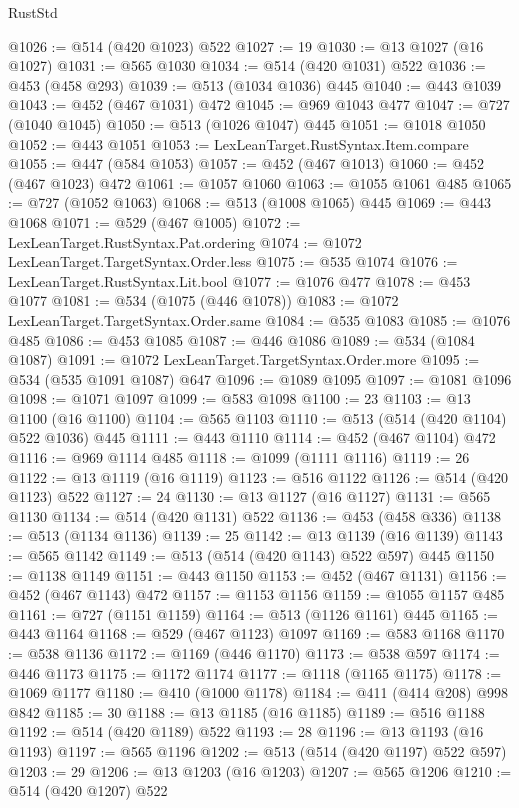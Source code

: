 \begin{lexlean}{RustStd}
\begin{coremodule}
@1026 := @514 (@420 @1023) @522
@1027 := 19
@1030 := @13 @1027 (@16 @1027)
@1031 := @565 @1030
@1034 := @514 (@420 @1031) @522
@1036 := @453 (@458 @293)
@1039 := @513 (@1034 @1036) @445
@1040 := @443 @1039
@1043 := @452 (@467 @1031) @472
@1045 := @969 @1043 @477
@1047 := @727 (@1040 @1045)
@1050 := @513 (@1026 @1047) @445
@1051 := @1018 @1050
@1052 := @443 @1051
@1053 := LexLeanTarget.RustSyntax.Item.compare
@1055 := @447 (@584 @1053)
@1057 := @452 (@467 @1013)
@1060 := @452 (@467 @1023) @472
@1061 := @1057 @1060
@1063 := @1055 @1061 @485
@1065 := @727 (@1052 @1063)
@1068 := @513 (@1008 @1065) @445
@1069 := @443 @1068
@1071 := @529 (@467 @1005)
@1072 := LexLeanTarget.RustSyntax.Pat.ordering
@1074 := @1072 LexLeanTarget.TargetSyntax.Order.less
@1075 := @535 @1074
@1076 := LexLeanTarget.RustSyntax.Lit.bool
@1077 := @1076 @477
@1078 := @453 @1077
@1081 := @534 (@1075 (@446 @1078))
@1083 := @1072 LexLeanTarget.TargetSyntax.Order.same
@1084 := @535 @1083
@1085 := @1076 @485
@1086 := @453 @1085
@1087 := @446 @1086
@1089 := @534 (@1084 @1087)
@1091 := @1072 LexLeanTarget.TargetSyntax.Order.more
@1095 := @534 (@535 @1091 @1087) @647
@1096 := @1089 @1095
@1097 := @1081 @1096
@1098 := @1071 @1097
@1099 := @583 @1098
@1100 := 23
@1103 := @13 @1100 (@16 @1100)
@1104 := @565 @1103
@1110 := @513 (@514 (@420 @1104) @522 @1036) @445
@1111 := @443 @1110
@1114 := @452 (@467 @1104) @472
@1116 := @969 @1114 @485
@1118 := @1099 (@1111 @1116)
@1119 := 26
@1122 := @13 @1119 (@16 @1119)
@1123 := @516 @1122
@1126 := @514 (@420 @1123) @522
@1127 := 24
@1130 := @13 @1127 (@16 @1127)
@1131 := @565 @1130
@1134 := @514 (@420 @1131) @522
@1136 := @453 (@458 @336)
@1138 := @513 (@1134 @1136)
@1139 := 25
@1142 := @13 @1139 (@16 @1139)
@1143 := @565 @1142
@1149 := @513 (@514 (@420 @1143) @522 @597) @445
@1150 := @1138 @1149
@1151 := @443 @1150
@1153 := @452 (@467 @1131)
@1156 := @452 (@467 @1143) @472
@1157 := @1153 @1156
@1159 := @1055 @1157 @485
@1161 := @727 (@1151 @1159)
@1164 := @513 (@1126 @1161) @445
@1165 := @443 @1164
@1168 := @529 (@467 @1123) @1097
@1169 := @583 @1168
@1170 := @538 @1136
@1172 := @1169 (@446 @1170)
@1173 := @538 @597
@1174 := @446 @1173
@1175 := @1172 @1174
@1177 := @1118 (@1165 @1175)
@1178 := @1069 @1177
@1180 := @410 (@1000 @1178)
@1184 := @411 (@414 @208) @998 @842
@1185 := 30
@1188 := @13 @1185 (@16 @1185)
@1189 := @516 @1188
@1192 := @514 (@420 @1189) @522
@1193 := 28
@1196 := @13 @1193 (@16 @1193)
@1197 := @565 @1196
@1202 := @513 (@514 (@420 @1197) @522 @597)
@1203 := 29
@1206 := @13 @1203 (@16 @1203)
@1207 := @565 @1206
@1210 := @514 (@420 @1207) @522

\end{coremodule}
\end{lexlean}
